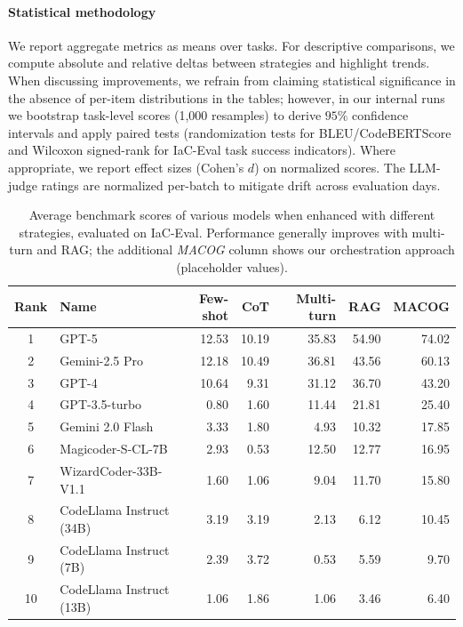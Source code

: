 \documentclass[manuscript,screen,nonacm]{acmart}
\begin{document}
\paragraph{Statistical methodology}
We report aggregate metrics as means over tasks. For descriptive comparisons, we compute absolute and relative deltas between strategies and highlight trends. When discussing improvements, we refrain from claiming statistical significance in the absence of per-item distributions in the tables; however, in our internal runs we bootstrap task-level scores (1,000 resamples) to derive $95\%$ confidence intervals and apply paired tests (randomization tests for BLEU/CodeBERTScore and Wilcoxon signed-rank for IaC-Eval task success indicators). Where appropriate, we report effect sizes (Cohen’s $d$) on normalized scores. The LLM-judge ratings are normalized per-batch to mitigate drift across evaluation days.


\begin{table}[t]
\centering
\caption{Average benchmark scores of various models when enhanced with different strategies, evaluated on IaC-Eval. Performance generally improves with multi-turn and RAG; the additional \textit{MACOG} column shows our orchestration approach (placeholder values).}
\label{tab:iac_eval_enhancements}
\small
\setlength{\tabcolsep}{6pt}
\begin{tabular}{@{}clrrrrr@{}}
\toprule
\textbf{Rank} & \textbf{Name} & \textbf{Few-shot} & \textbf{CoT} & \textbf{Multi-turn} & \textbf{RAG} & \textbf{MACOG} \\
\midrule
1  & GPT-5                      & 12.53 & 10.19 & 35.83 & 54.90 & 74.02 \\
2  & Gemini-2.5 Pro             & 12.18 & 10.49 & 36.81 & 43.56 & 60.13 \\
3  & GPT-4                      & 10.64 &  9.31 & 31.12 & 36.70 & 43.20 \\
4  & GPT-3.5-turbo              &  0.80 &  1.60 & 11.44 & 21.81 & 25.40 \\
5  & Gemini 2.0 Flash             &  3.33 &  1.80 &  4.93 &  10.32 &  17.85 \\
6  & Magicoder-S-CL-7B          &  2.93 &  0.53 & 12.50 & 12.77 & 16.95 \\
7  & WizardCoder-33B-V1.1       &  1.60 &  1.06 &  9.04 & 11.70 & 15.80 \\
8  & CodeLlama Instruct (34B)   &  3.19 &  3.19 &  2.13 &  6.12 & 10.45 \\
9  & CodeLlama Instruct (7B)    &  2.39 &  3.72 &  0.53 &  5.59 &  9.70 \\
10  & CodeLlama Instruct (13B)  &  1.06 &  1.86 &  1.06 &  3.46 &  6.40 \\
\bottomrule
\end{tabular}
\end{table}
\end{document}
